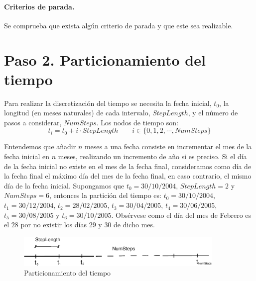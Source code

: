 \paragraph{Criterios de parada.} Se comprueba que exista alg\'un
criterio de parada y que este sea realizable.


\section{Paso 2. Particionamiento del tiempo}

Para realizar la discretizaci\'on del tiempo se necesita la fecha inicial, $t_0$,
la longitud (en meses naturales) de cada intervalo, $StepLength$, y el n\'umero
de pasos a considerar, $NumSteps$. Los nodos de tiempo son:
\begin{displaymath}
t_i = t_0 + i \cdot StepLength \qquad i \in \{0, 1, 2, \cdots, NumSteps\}
\end{displaymath}

Entendemos que a\~nadir $n$ meses a una fecha consiste en incrementar el
mes de la fecha inicial en $n$ meses, realizando un incremento de a\~no si
es preciso. Si el d\'ia de la fecha inicial no existe en el mes de la fecha
final, consideramos como d\'ia de la fecha final el m\'aximo d\'ia del mes
de la fecha final, en caso contrario, el mismo d\'ia de la fecha inicial.
\newline
\newline
Supongamos que $t_0=30/10/2004$, $StepLength=2$ y $NumSteps=6$, entonces la
partici\'on del tiempo es: $t_0=30/10/2004$, $t_1=30/12/2004$, $t_2=28/02/2005$,
$t_3=30/04/2005$, $t_4=30/06/2005$, $t_5=30/08/2005$ y $t_6=30/10/2005$.
Obs\'ervese como el d\'ia del mes de Febrero es el $28$ por no existir los
d\'ias $29$ y $30$ de dicho mes.

\begin{figure}[!hb]
\begin{center}
\includegraphics[width=10cm,angle=0]{./images/time.eps}
\caption{Particionamiento del tiempo}
\label{timetranches}
\end{center}
\end{figure}


